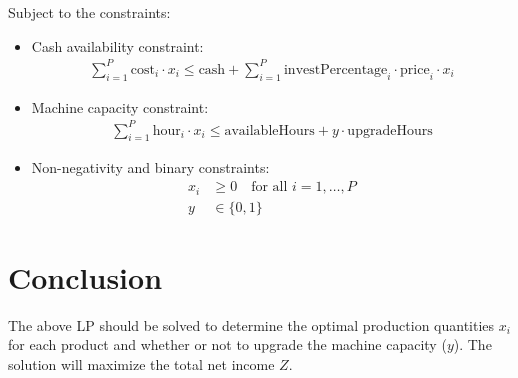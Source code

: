 \documentclass{article}
\begin{document}
Subject to the constraints:
\begin{itemize}
    \item Cash availability constraint:
    \begin{align*}
        \sum_{i=1}^{P} \text{cost}_i \cdot x_i \leq \text{cash} + \sum_{i=1}^{P} \text{investPercentage}_i \cdot \text{price}_i \cdot x_i
    \end{align*}
    \item Machine capacity constraint:
    \begin{align*}
        \sum_{i=1}^{P} \text{hour}_i \cdot x_i \leq \text{availableHours} + y \cdot \text{upgradeHours}
    \end{align*}
    \item Non-negativity and binary constraints:
    \begin{align*}
        x_i &\geq 0 \quad \text{for all } i = 1, \ldots, P \\
        y &\in \{0, 1\}
    \end{align*}
\end{itemize}

\section*{Conclusion}

The above LP should be solved to determine the optimal production quantities $x_i$ for each product and whether or not to upgrade the machine capacity ($y$). The solution will maximize the total net income $Z$.
\end{document}
